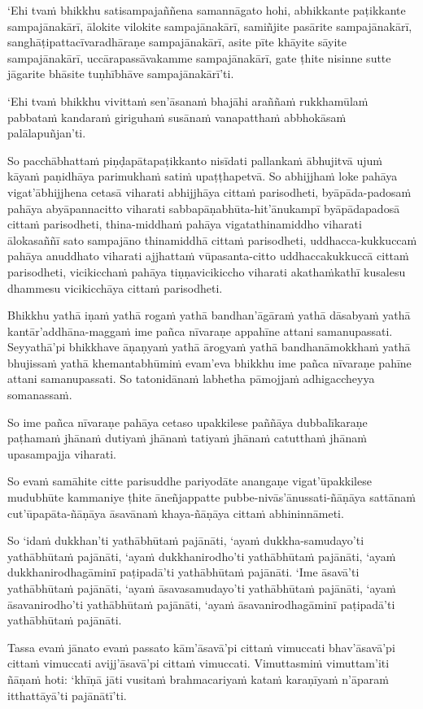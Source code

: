 `Ehi tvaṁ bhikkhu satisampajaññena samannāgato hohi, abhikkante paṭikkante sampajānakārī, ālokite vilokite sampajānakārī, samiñjite pasārite sampajānakārī, sanghāṭipattacīvaradhāraṇe sampajānakārī, asite pīte khāyite sāyite sampajānakārī, uccārapassāvakamme sampajānakārī, gate ṭhite nisinne sutte jāgarite bhāsite tuṇhībhāve sampajānakārī'ti.

`Ehi tvaṁ bhikkhu vivittaṁ sen'āsanaṁ bhajāhi araññaṁ rukkhamūlaṁ pabbataṁ kandaraṁ giriguhaṁ susānaṁ vanapatthaṁ abbhokāsaṁ palālapuñjan'ti.

So pacchābhattaṁ piṇḍapātapaṭikkanto nisīdati pallankaṁ ābhujitvā ujuṁ kāyaṁ paṇidhāya parimukhaṁ satiṁ upaṭṭhapetvā. So abhijjhaṁ loke pahāya vigat'ābhijjhena cetasā viharati abhijjhāya cittaṁ parisodheti, byāpāda-padosaṁ pahāya abyāpannacitto viharati sabbapāṇabhūta-hit'ānukampī byāpādapadosā cittaṁ parisodheti, thina-middhaṁ pahāya vigatathinamiddho viharati ālokasaññī sato sampajāno thinamiddhā cittaṁ parisodheti, uddhacca-kukkuccaṁ pahāya anuddhato viharati ajjhattaṁ vūpasanta-citto uddhaccakukkuccā cittaṁ parisodheti, vicikicchaṁ pahāya tiṇṇavicikiccho viharati akathaṁkathī kusalesu dhammesu vicikicchāya cittaṁ parisodheti.

\suttaRef{[MN 107]}

Bhikkhu yathā iṇaṁ yathā rogaṁ yathā bandhan'āgāraṁ yathā dāsabyaṁ yathā kantār'addhāna-maggaṁ ime pañca nīvaraṇe appahīne attani samanupassati. Seyyathā'pi bhikkhave āṇaṇyaṁ yathā ārogyaṁ yathā bandhanāmokkhaṁ yathā bhujissaṁ yathā khemantabhūmiṁ evam'eva bhikkhu ime pañca nīvaraṇe pahīne attani samanupassati. So tatonidānaṁ labhetha pāmojjaṁ adhigaccheyya somanassaṁ.

So ime pañca nīvaraṇe pahāya cetaso upakkilese paññāya dubbalīkaraṇe paṭhamaṁ jhānaṁ dutiyaṁ jhānaṁ tatiyaṁ jhānaṁ catutthaṁ jhānaṁ upasampajja viharati.

So evaṁ samāhite citte parisuddhe pariyodāte anangaṇe vigat'ūpakkilese mudubhūte kammaniye ṭhite āneñjappatte pubbe-nivās'ānussati-ñāṇāya sattānaṁ cut'ūpapāta-ñāṇāya āsavānaṁ khaya-ñāṇāya cittaṁ abhininnāmeti.

So `idaṁ dukkhan'ti yathābhūtaṁ pajānāti, `ayaṁ dukkha-samudayo'ti yathābhūtaṁ pajānāti, `ayaṁ dukkhanirodho'ti yathābhūtaṁ pajānāti, `ayaṁ dukkhanirodhagāminī paṭipadā'ti yathābhūtaṁ pajānāti. `Ime āsavā'ti yathābhūtaṁ pajānāti, `ayaṁ āsavasamudayo'ti yathābhūtaṁ pajānāti, `ayaṁ āsavanirodho'ti yathābhūtaṁ pajānāti, `ayaṁ āsavanirodhagāminī paṭipadā'ti yathābhūtaṁ pajānāti.

Tassa evaṁ jānato evaṁ passato kām'āsavā'pi cittaṁ vimuccati bhav'āsavā'pi cittaṁ vimuccati avijj'āsavā'pi cittaṁ vimuccati. Vimuttasmiṁ vimuttam'iti ñāṇaṁ hoti: `khīṇā jāti vusitaṁ brahmacariyaṁ kataṁ karaṇīyaṁ n'āparaṁ itthattāyā'ti pajānātī'ti.


